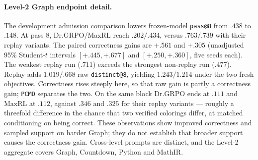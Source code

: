 \documentclass{article}
\makeatletter
\newcommand{\1}{\mathbf 1}
\newcommand{\pmd}{\texttt{PCMD}}
\newcommand{\distk}{\texttt{distinct@8}}
\theoremstyle{remark}
\theoremstyle{definition}
\theoremstyle{plain}
\makeatother
\begin{document}
\begin{table}[!htbp]
  \centering
  \caption{\textbf{Fresh-objective effects and replay interactions on Level 2.}
  All three contrasts within a domain use the same four-arm seed
  intersection. The interaction is
  $(\mathrm{Re:Max}-\mathrm{MaxRL})-
  (\mathrm{Re:Dr}-\mathrm{Dr.GRPO})$.
  Each entry gives its mean and, only for a complete five-seed block, a
  paired unadjusted 95\% Student-$t$ interval. This is the one table that keeps
  the \distk{} axis: an interaction needs both differences on the same seed, and
  at Level 2 the seeds where all four arms define \pmd{} number five only on
  Python, four on MathIR, three on Graph, two on PantryPlan and none on
  Countdown --- too thin to carry the estimand.}
  \label{tab:level2-factorial-contrasts}
  \scriptsize
  \setlength{\tabcolsep}{3pt}
\end{table}


\paragraph{Level-2 Graph endpoint detail.}
\label{app:levels-numerical-detail}
The development admission comparison lowers frozen-model \texttt{pass@8} from $.438$
to $.148$. At pass 8, Dr.GRPO/MaxRL reach $.202/.434$, versus $.763/.739$
with their replay variants. The paired correctness gains are $+.561$ and
$+.305$ (unadjusted 95\% Student-$t$ intervals $[+.445,+.677]$ and
$[+.250,+.360]$, five seeds each). The weakest replay run ($.711$) exceeds
the strongest non-replay run ($.477$). Replay adds $1.019/.668$ raw
\texttt{distinct@8}, yielding $1.243/1.214$ under the two fresh objectives.
Correctness rises steeply here, so that raw gain is partly a correctness gain;
\pmd{} separates the two. On the same block Dr.GRPO ends at $.111$ and MaxRL at
$.112$, against $.346$ and $.325$ for their replay variants --- roughly a
threefold difference in the chance that two verified colorings differ, at
matched conditioning on being correct.
These observations show improved correctness and sampled support on harder
Graph; they do not establish that broader support causes the correctness
gain. Cross-level prompts are distinct, and the Level-2 aggregate
covers Graph, Countdown, Python and MathIR.
\end{document}
